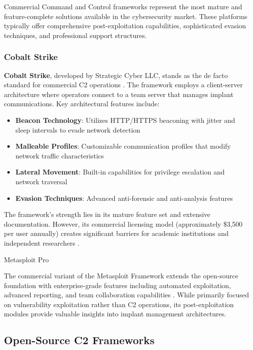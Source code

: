 Commercial Command and Control frameworks represent the most mature and feature-complete solutions available in the cybersecurity market. These platforms typically offer comprehensive post-exploitation capabilities, sophisticated evasion techniques, and professional support structures.

\subsubsection{Cobalt Strike}

\textbf{Cobalt Strike}, developed by Strategic Cyber LLC, stands as the de facto standard for commercial C2 operations \cite{mudge2012cobalt}. The framework employs a client-server architecture where operators connect to a team server that manages implant communications. Key architectural features include:

\begin{itemize}
\item \textbf{Beacon Technology}: Utilizes HTTP/HTTPS beaconing with jitter and sleep intervals to evade network detection
\item \textbf{Malleable Profiles}: Customizable communication profiles that modify network traffic characteristics
\item \textbf{Lateral Movement}: Built-in capabilities for privilege escalation and network traversal
\item \textbf{Evasion Techniques}: Advanced anti-forensic and anti-analysis features
\end{itemize}

The framework's strength lies in its mature feature set and extensive documentation. However, its commercial licensing model (approximately \$3,500 per user annually) creates significant barriers for academic institutions and independent researchers \cite{rapid7_2023_cs}.

Metasploit Pro

The commercial variant of the Metasploit Framework extends the open-source foundation with enterprise-grade features including automated exploitation, advanced reporting, and team collaboration capabilities \cite{kennedy2011metasploit}. While primarily focused on vulnerability exploitation rather than C2 operations, its post-exploitation modules provide valuable insights into implant management architectures.

\subsection{Open-Source C2 Frameworks}
\label{subsec:opensource_solutions}

